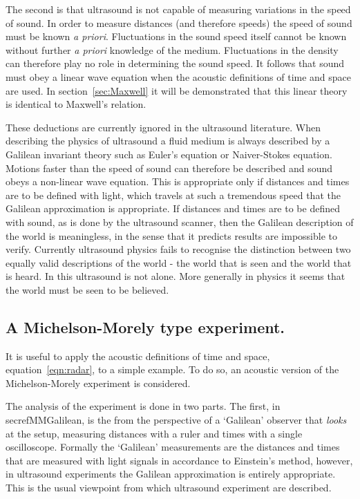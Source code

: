 \documentclass[10pt, fleqn,draft,showtrims,oldfontcommands]{article} %
\newcommand{\secref}[1]{section~\ref{sec:#1}}
\begin{document}
The second is that ultrasound is not capable of  measuring variations in the speed of sound.
In order to measure distances (and therefore speeds) the speed of sound must be known {\em a priori}.
Fluctuations in the sound speed itself cannot be known without further {\em a priori} knowledge of the medium. 
Fluctuations in the density  can therefore play no role in determining the sound speed. %
It follows that sound must obey a linear wave equation when the acoustic definitions of time and space are used.
In \secref{Maxwell} it will be demonstrated that this linear theory is identical to Maxwell's relation.


These deductions are currently ignored in the ultrasound literature.
When describing the physics of ultrasound a fluid medium is always described by a Galilean invariant theory such as Euler's equation or Naiver-Stokes equation.
Motions faster than the speed of sound can therefore be described and sound obeys a non-linear wave equation.
This is appropriate only if distances and times are to be defined with light, which travels at such a tremendous speed that the Galilean approximation is appropriate.
If distances and times are to be defined with sound, as is done by the ultrasound scanner,
then the Galilean description of the world is meaningless, in the sense that it predicts  results are impossible to verify.
Currently ultrasound physics fails to recognise the distinction between  two equally valid descriptions of the world -
the world that is seen
and the world that is heard.
In this ultrasound is not alone.
More generally in physics it seems that the world must be seen to be believed.

\subsection{A Michelson-Morely type experiment.}

It is useful to apply the acoustic definitions of time and space, equation~\ref{eqn:radar}, to a simple example.
To do so, an acoustic version of the  Michelson-Morely experiment is considered.

The analysis of the experiment is done in two parts.
The first, in secref{MMGalilean}, is the from the perspective of a `Galilean' observer that {\em looks} at the setup,
measuring distances with a ruler and times with a single oscilloscope.
Formally the `Galilean' measurements are the distances and times that are  measured with light signals in accordance to Einstein's method,
however, in ultrasound experiments the Galilean approximation is entirely appropriate.
This is the usual viewpoint from which ultrasound experiment are described.
\end{document}
